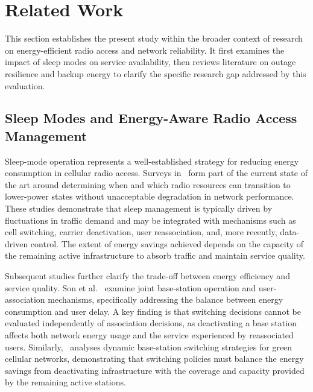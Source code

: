 \section{Related Work}

This section establishes the present study within the broader context of research on energy-efficient radio access and network reliability. It first examines the impact of sleep modes on service availability, then reviews literature on outage resilience and backup energy to clarify the specific research gap addressed by this evaluation.

\subsection{Sleep Modes and Energy-Aware Radio Access Management}

Sleep-mode operation represents a well-established strategy for reducing energy consumption in cellular radio access. Surveys in~\cite{wu2015sleep,lopezPerez2022ranEnergy} form part of the current state of the art around determining when and which radio resources can transition to lower-power states without unacceptable degradation in network performance. These studies demonstrate that sleep management is typically driven by fluctuations in traffic demand and may be integrated with mechanisms such as cell switching, carrier deactivation, user reassociation, and, more recently, data-driven control. The extent of energy savings achieved depends on the capacity of the remaining active infrastructure to absorb traffic and maintain service quality.

Subsequent studies further clarify the trade-off between energy efficiency and service quality. Son et al.~\cite{son2011energyDelay} examine joint base-station operation and user-association mechanisms, specifically addressing the balance between energy consumption and user delay. A key finding is that switching decisions cannot be evaluated independently of association decisions, as deactivating a base station affects both network energy usage and the service experienced by reassociated users. Similarly,~\cite{oh2013dynamicSwitching} analyses dynamic base-station switching strategies for green cellular networks, demonstrating that switching policies must balance the energy savings from deactivating infrastructure with the coverage and capacity provided by the remaining active stations.

